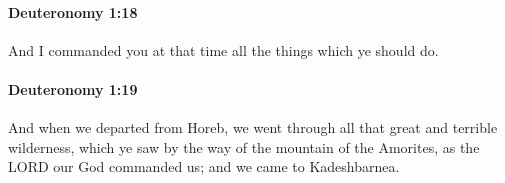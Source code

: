 		\paragraph{Deuteronomy 1:18} %
			\label{DEUTERONOMY-1-18}

			And I commanded you at that time all the things which ye should do.


		\paragraph{Deuteronomy 1:19} %
			\label{DEUTERONOMY-1-19}

			And when we departed from Horeb, we went through all that great and terrible wilderness, which ye saw by the way of the mountain of the Amorites, as the LORD our God commanded us; and we came to Kadeshbarnea.


